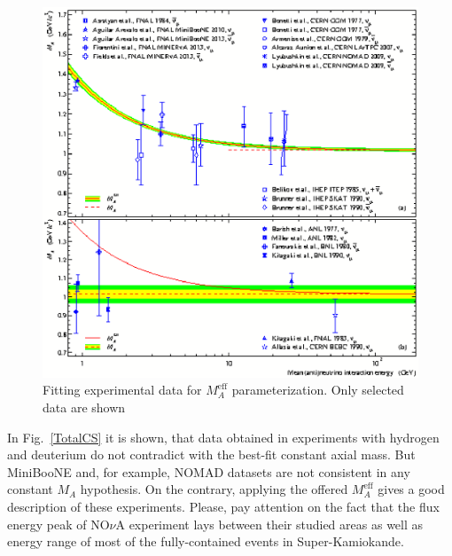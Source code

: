 \begin{figure}[htb!]
\includegraphics[width=\columnwidth]{./QES/MA_QES_eff.eps}
\caption{\label{MA_QES_eff}Fitting experimental data for $M_{A}^\mathrm{eff}$ parameterization. Only selected data are shown}
\end{figure}

In Fig.~\ref{TotalCS} it is shown, that data obtained in experiments with hydrogen and deuterium do not contradict with the best-fit constant axial mass. But MiniBooNE and, for example, NOMAD datasets are not consistent in any constant $M_{A}$ hypothesis. On the contrary, applying the offered $M_{A}^\mathrm{eff}$ gives a good description of these experiments. Please, pay attention on the fact that the flux energy peak of NO$\nu$A experiment lays between their studied areas as well as energy range of most of the fully-contained events in Super-Kamiokande.
